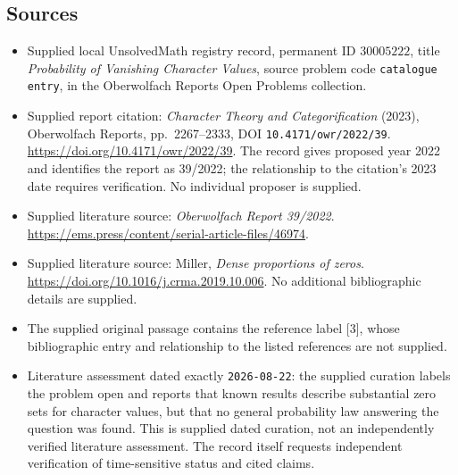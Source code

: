 \documentclass[11pt]{article}
\begin{document}
\subsection{Sources}
\begin{itemize}
\item Supplied local UnsolvedMath registry record, permanent ID \(30005222\), title \emph{Probability of Vanishing Character Values}, source problem code \texttt{catalogue entry}, in the Oberwolfach Reports Open Problems collection.
\item Supplied report citation: \emph{Character Theory and Categorification} (2023), Oberwolfach Reports, pp.~2267--2333, DOI \texttt{10.4171/owr/2022/39}. \url{https://doi.org/10.4171/owr/2022/39}. The record gives proposed year 2022 and identifies the report as 39/2022; the relationship to the citation's 2023 date requires verification. No individual proposer is supplied.
\item Supplied literature source: \emph{Oberwolfach Report 39/2022}. \url{https://ems.press/content/serial-article-files/46974}.
\item Supplied literature source: Miller, \emph{Dense proportions of zeros}. \url{https://doi.org/10.1016/j.crma.2019.10.006}. No additional bibliographic details are supplied.
\item The supplied original passage contains the reference label [3], whose bibliographic entry and relationship to the listed references are not supplied.
\item Literature assessment dated exactly \texttt{2026-08-22}: the supplied curation labels the problem open and reports that known results describe substantial zero sets for character values, but that no general probability law answering the question was found. This is supplied dated curation, not an independently verified literature assessment. The record itself requests independent verification of time-sensitive status and cited claims.
\end{itemize}
\end{document}
